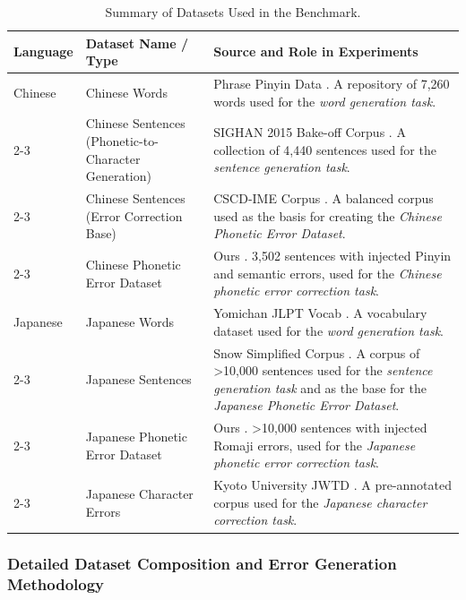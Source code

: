 \documentclass[10pt, a4paper]{article}
\begin{document}
\begin{table}[h!]
\centering
\small
\caption{Summary of Datasets Used in the Benchmark.}
\label{tab:appendix_datasets}
\begin{tabular}{p{1.5cm} p{1.5cm} p{3.5cm}}
\toprule
\textbf{Language} & \textbf{Dataset Name / Type} & \textbf{Source and Role in Experiments} \\
\midrule
{Chinese} & Chinese Words & {Phrase Pinyin Data} \citep{phrase-pinyin-data}. A repository of 7,260 words used for the \textit{word generation task}. \\
\cmidrule(lr){2-3}
& Chinese Sentences (Phonetic-to-Character Generation) & {SIGHAN 2015 Bake-off Corpus} \citep{tseng2015introduction}. A collection of 4,440 sentences used for the \textit{sentence generation task}. \\
\cmidrule(lr){2-3}
& Chinese Sentences (Error Correction Base) & {CSCD-IME Corpus} \citep{nghuyong2024cscdime}. A balanced corpus used as the basis for creating the \textit{Chinese Phonetic Error Dataset}. \\
\cmidrule(lr){2-3}
& Chinese Phonetic Error Dataset & {Ours} \citep{my_chinese_error_dataset}. 3,502 sentences with injected Pinyin and semantic errors, used for the \textit{Chinese phonetic error correction task}. \\
\midrule
{Japanese} & Japanese Words & {Yomichan JLPT Vocab} \citep{stephenmk2024yomichan}. A vocabulary dataset used for the \textit{word generation task}. \\
\cmidrule(lr){2-3}
& Japanese Sentences & {Snow Simplified Corpus} \citep{snow2024simplified}. A corpus of >10,000 sentences used for the \textit{sentence generation task} and as the base for the \textit{Japanese Phonetic Error Dataset}. \\
\cmidrule(lr){2-3}
& Japanese Phonetic Error Dataset & {Ours} \citep{my_japanese_error_dataset}. >10,000 sentences with injected Romaji errors, used for the \textit{Japanese phonetic error correction task}. \\
\cmidrule(lr){2-3}
& Japanese Character Errors & {Kyoto University JWTD} \citep{kyoto2024japanesetexts}. A pre-annotated corpus used for the \textit{Japanese character correction task}. \\
\bottomrule
\end{tabular}
\end{table}

\subsubsection{Detailed Dataset Composition and Error Generation Methodology}
\end{document}
